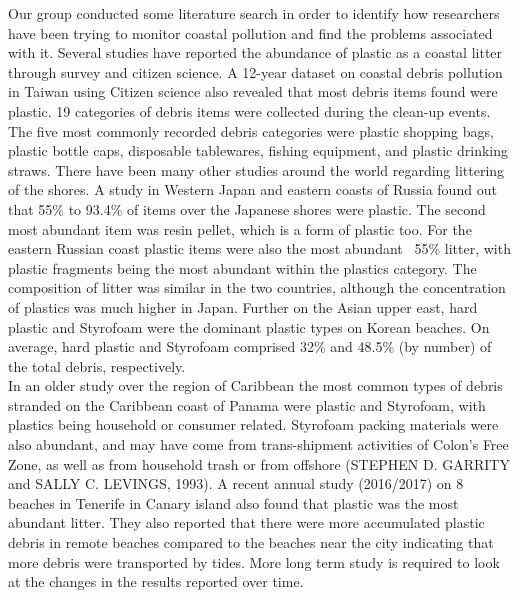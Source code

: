 \documentclass[10pt]{article}\usepackage[]{graphicx}\usepackage[]{color}
\begin{document}
Our group conducted some literature search in order to identify how researchers have been trying to monitor coastal pollution and find the problems associated with it. Several studies have reported the abundance of plastic as a coastal litter through survey and citizen science. A 12-year dataset on coastal debris pollution in Taiwan using Citizen science also revealed that most debris items found were plastic. \cite{WALTHER2018} 19 categories of debris items were collected during the clean-up events. The five most commonly recorded debris categories were plastic shopping bags, plastic bottle caps, disposable tablewares, fishing equipment, and plastic drinking straws. There have been many other studies around the world regarding littering of the shores. A study in Western Japan and eastern coasts of Russia found out that 55\% to 93.4\% of items over the Japanese shores were plastic. The second most abundant item was resin pellet, which is a form of plastic too. For the eastern Russian coast plastic items were also the most abundant ~55\% litter, with plastic fragments being the most abundant within the plastics category. The composition of litter was similar in the two countries, although the concentration of plastics was much higher in Japan. \cite{KUSUI2003} Further on the Asian upper east, hard plastic and Styrofoam were the dominant plastic types on Korean beaches. On average, hard plastic and Styrofoam comprised 32\% and 48.5\% (by number) of the total debris, respectively. \\

In an older study over the region of Caribbean the most common types of debris stranded on the Caribbean coast of Panama were plastic and Styrofoam, with plastics being household or consumer related. Styrofoam packing materials were also abundant, and may have come from trans-shipment activities of Colon's Free Zone, as well as from household trash or from offshore (STEPHEN D. GARRITY and SALLY C. LEVINGS, 1993). A recent annual study (2016/2017) on 8 beaches in Tenerife in Canary island also found that plastic was the most abundant litter. They also reported that there were more accumulated plastic debris in remote beaches compared to the beaches near the city indicating that more debris were transported by tides. More long term study is required to look at the changes in the results reported over time. \cite{REINOLD2020} \\
\end{document}
